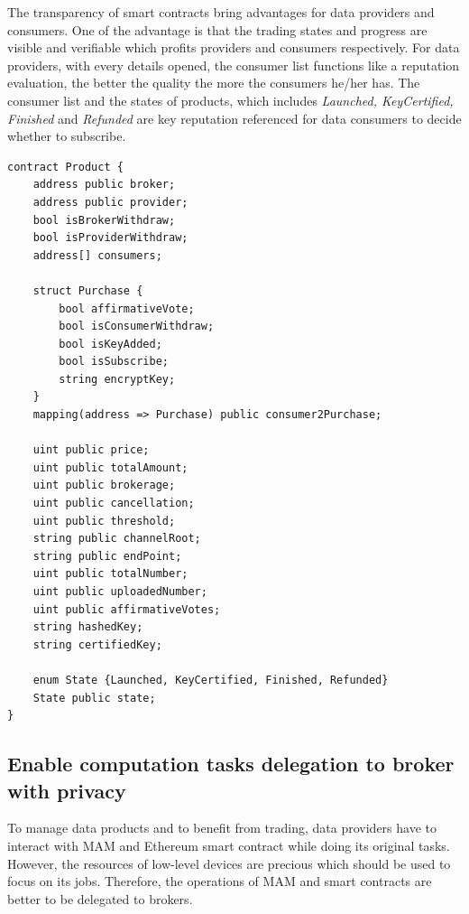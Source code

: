 \documentclass[conference]{IEEEtran}
\begin{document}
The transparency of smart contracts bring advantages for data providers and consumers. One of the advantage is that the trading states and progress are visible and verifiable which profits providers and consumers respectively. For data providers, with every details opened, the consumer list functions like a reputation evaluation, the better the quality the more the consumers he/her has. The consumer list and the states of products, which includes \textit{Launched, KeyCertified, Finished} and \textit{Refunded} are key reputation referenced for data consumers to decide whether to subscribe. 

\lstset{style=solidity}
\begin{lstlisting}[caption={Product Contract data fields}, label={lst:constructor}, frame=single]
contract Product {
    address public broker;
    address public provider;
    bool isBrokerWithdraw;
    bool isProviderWithdraw;
    address[] consumers;
    
    struct Purchase {
        bool affirmativeVote;
        bool isConsumerWithdraw;
        bool isKeyAdded;
        bool isSubscribe;
        string encryptKey;
    }
    mapping(address => Purchase) public consumer2Purchase;
    
    uint public price;
    uint public totalAmount;
    uint public brokerage;
    uint public cancellation;
    uint public threshold;
    string public channelRoot;
    string public endPoint;
    uint public totalNumber;
    uint public uploadedNumber;
    uint public affirmativeVotes;
    string hashedKey;
    string certifiedKey;
    
    enum State {Launched, KeyCertified, Finished, Refunded}
    State public state;
}
\end{lstlisting}

\subsection{Enable computation tasks delegation to broker with privacy}
To manage data products and to benefit from trading, data providers have to interact with MAM and Ethereum smart contract while doing its original tasks. However, the resources of low-level devices are precious which should be used to focus on its jobs. Therefore, the operations of MAM and smart contracts are better to be delegated to brokers. 
\end{document}
